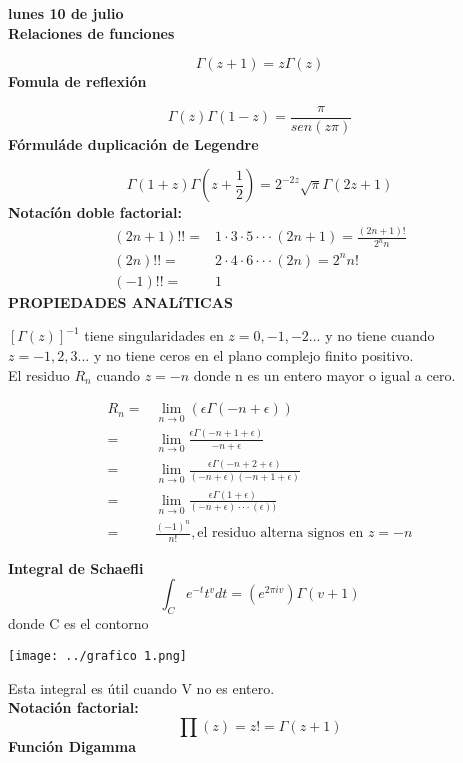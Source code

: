 \documentclass{article}
\theoremstyle{definition}
\begin{document}
\textbf{lunes 10 de julio}\\
\textbf{Relaciones de funciones}

\[\Gamma (z+1) = z\Gamma (z)\]
\textbf{Fomula de reflexión}

\[\Gamma (z)\Gamma (1-z) = \frac{\pi}{sen(z\pi)}\]
\textbf{Fórmuláde duplicación de Legendre}

\[\Gamma (1+z)\Gamma (z+\frac{1}{2}) = 2^{-2z}\sqrt{\pi}\Gamma (2z+1) \]
\textbf{Notacíón doble factorial: }
\[
\begin{array}{rl}
	(2n+1)!!=& 1\cdot 3\cdot 5\cdot\cdot\cdot (2n+1)=\frac{(2n+1)!}{2^nn}\\
	(2n)!!=& 2\cdot 4\cdot 6\cdot\cdot\cdot (2n)=2^nn!\\
	(-1)!!=& 1
\end{array}
\]
\textbf{PROPIEDADES ANALíTICAS}

$[\Gamma (z)]^{-1}$ tiene singularidades en $z=0,-1,-2...$ y no tiene cuando  $z=-1,2,3...$ y no tiene ceros en el plano complejo finito positivo.\\
El residuo $R_n$ cuando $z=-n$ donde n es un entero mayor o igual a cero.

\[
\begin{array}{rl}
	R_n=&\lim\limits_{n\to 0} (\epsilon\Gamma (-n+\epsilon))\\
	=& \lim\limits_{n\to 0} \frac{\epsilon\Gamma (-n+1+\epsilon)}{-n+\epsilon}\\
	=& \lim\limits_{n\to 0} \frac{\epsilon\Gamma (-n+2+\epsilon)}{(-n+\epsilon)(-n+1+\epsilon)}\\
	=&\lim\limits_{n\to 0} \frac{\epsilon\Gamma (1+\epsilon)}{(-n+\epsilon)\cdot\cdot\cdot(\epsilon))}\\
	=& \frac{(-1)^n}{n!}, \text{el residuo alterna signos en } z=-n
\end{array}
\]

\textbf{Integral de Schaefli}
\[\int_Ce^{-t}t^vdt=(e^{2\pi iv})\Gamma (v+1)\]
donde C es el contorno
\begin{center}
\texttt{[image: ../grafico 1.png]} 
\end{center}

Esta integral es útil cuando V no es entero.\\
\textbf{Notación factorial:}
\[\prod (z)=z!=\Gamma (z+1)\]
\textbf{Función Digamma}
\end{document}
